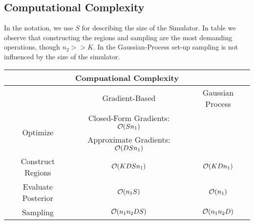 \subsection{Computational Complexity}

In the notation, we use $S$ for describing the size of the Simulator. In table we observe that constructing the regions and sampling are the most demanding operations, though $n_2 >> K$. In the Gaussian-Process set-up sampling is not influenced by the size of the simulator.

\begin{tabular}{|c||c|c|}
 \hline
 \multicolumn{3}{|c|}{Compuational Complexity} \\
  \hline
  & Gradient-Based     & Gaussian Process\\
  \hline
  \multirow{2}{3.5em}{Optimize}  & Closed-Form Gradients: $\mathcal{O}(Sn_1)$   &  \\
                               & Approximate Gradients: $\mathcal{O}(DSn_1)$  &  \\  
  \hline
  Construct Regions    & $\mathcal{O}(KDSn_1)$  & $\mathcal{O}(KDn_1)$ \\
  \hline
  Evaluate Posterior   & $\mathcal{O}(n_1S)$  & $\mathcal{O}(n_1)$ \\
  \hline
  Sampling             & $\mathcal{O}(n_1n_2DS)$ & $\mathcal{O}(n_1n_2D)$ \\
 \hline
\end{tabular}

